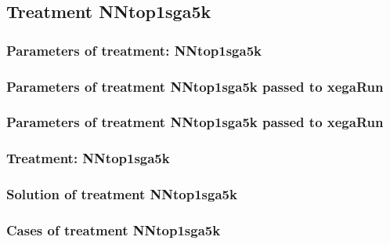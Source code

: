 \documentclass[18pt,c]{beamer}
\makeatletter
\def\beamer@writeslidentry@miniframesoff{%
  \expandafter\beamer@ifempty\expandafter{\beamer@framestartpage}{}%
  {%
   \clearpage\beamer@notesactions%
  }
}
\newcommand*{\miniframesoff}{\let\beamer@writeslidentry=\beamer@writeslidentry@miniframesoff}
\makeatother
\begin{document}
\miniframesoff
\subsection{Treatment NNtop1sga5k}

 \begin{frame}
 \fontsize{8pt}{9pt}\selectfont
 \frametitle{  Parameters of treatment: NNtop1sga5k 
 }

 \label{ExpDtParmTable009.tex}  
 \end{frame}


 \begin{frame}
 \fontsize{8pt}{9pt}\selectfont
 \frametitle{  Parameters of treatment NNtop1sga5k passed to xegaRun
 }

 \label{ExpDtParmTable010.tex}  
 \end{frame}


 \begin{frame}
 \fontsize{8pt}{9pt}\selectfont
 \frametitle{  Parameters of treatment NNtop1sga5k passed to xegaRun
 }

 \label{ExpDtParmTable011.tex}  
 \end{frame}

 \begin{frame}
 \fontsize{8pt}{9pt}\selectfont
 \frametitle{ Treatment: NNtop1sga5k }

 \label{ExpDStatsTable006.tex}  
 \end{frame}

 \begin{frame}
 \fontsize{8pt}{9pt}\selectfont
 \frametitle{ Solution of treatment NNtop1sga5k }

 \label{ExpDSolutionTable007.tex}  
 \end{frame}

 \begin{frame}
 \fontsize{8pt}{9pt}\selectfont
 \frametitle{ Cases of treatment NNtop1sga5k }

 \label{ExpDSolutionTable008.tex}  
 \end{frame}
\end{document}
